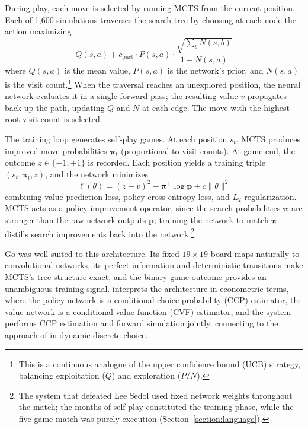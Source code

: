 During play, each move is selected by running MCTS from the current position. Each of 1,600 simulations traverses the search tree by choosing at each node the action maximizing
$$Q(s,a) + c_{\text{puct}} \cdot P(s,a) \cdot \frac{\sqrt{\sum_b N(s,b)}}{1 + N(s,a)}$$
where $Q(s,a)$ is the mean value, $P(s,a)$ is the network's prior, and $N(s,a)$ is the visit count.\footnote{This is a continuous analogue of the upper confidence bound (UCB) strategy, balancing exploitation ($Q$) and exploration ($P/N$).} When the traversal reaches an unexplored position, the neural network evaluates it in a single forward pass; the resulting value $v$ propagates back up the path, updating $Q$ and $N$ at each edge. The move with the highest root visit count is selected.


The training loop generates self-play games. At each position $s_t$, MCTS produces improved move probabilities $\boldsymbol{\pi}_t$ (proportional to visit counts). At game end, the outcome $z \in \{-1, +1\}$ is recorded. Each position yields a training triple $(s_t, \boldsymbol{\pi}_t, z)$, and the network minimizes
\begin{equation}
\ell(\theta) = (z - v)^2 - \boldsymbol{\pi}^\top \log \mathbf{p} + c \|\theta\|^2
\end{equation}
combining value prediction loss, policy cross-entropy loss, and $L_2$ regularization. MCTS acts as a policy improvement operator, since the search probabilities $\boldsymbol{\pi}$ are stronger than the raw network outputs $\mathbf{p}$; training the network to match $\boldsymbol{\pi}$ distills search improvements back into the network.\footnote{The system that defeated Lee Sedol used fixed network weights throughout the match; the months of self-play constituted the training phase, while the five-game match was purely execution (Section~\ref{section:language}).}

Go was well-suited to this architecture. Its fixed $19 \times 19$ board maps naturally to convolutional networks, its perfect information and deterministic transitions make MCTS's tree structure exact, and the binary game outcome provides an unambiguous training signal. \citet{Igami2020} interprets the architecture in econometric terms, where the policy network is a conditional choice probability (CCP) estimator, the value network is a conditional value function (CVF) estimator, and the system performs CCP estimation and forward simulation jointly, connecting to the approach of \citet{HotzMiller1993} in dynamic discrete choice.
